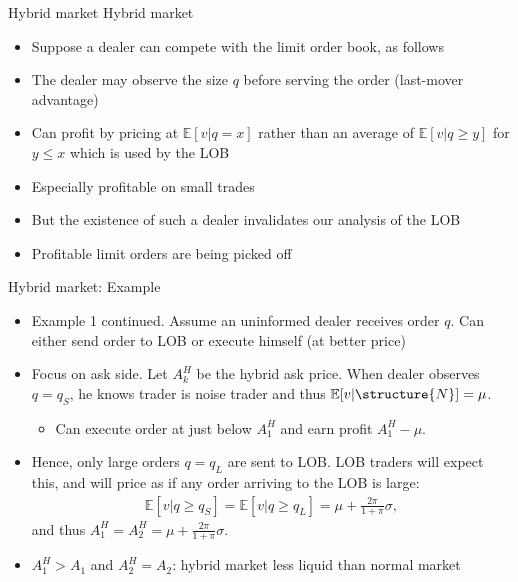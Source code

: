 \documentclass[english,10pt]{beamer}
\begin{document}
\begin{frame}{Hybrid market}
	Hybrid market
	\begin{itemize}
		\item Suppose a dealer can compete with the limit order book, as follows
		\item The dealer may observe the size $q$ before serving the order (last-mover advantage)
		\item Can profit by pricing at $\mathbb{E}[v|q=x]$ rather than an average of $\mathbb{E}[v|q \geq y]$ for $y \leq x$ which is used by the LOB
		\item Especially profitable on small trades
		\item But the existence of such a dealer invalidates our analysis of the LOB
		\item Profitable limit orders are being picked off
	\end{itemize}
\end{frame}


\begin{frame}{Hybrid market: Example}
	\begin{itemize}
		\item Example 1 continued. Assume an uninformed dealer receives order $q$. Can either send order to LOB or execute himself (at better price) 
		\item Focus on ask side. Let $A^H_k$ be the hybrid ask price. When dealer observes $q=q_S$, he knows trader is noise trader and thus $\mathbb{E}[v|\structure{N}]=\mu$. 
		\begin{itemize}
			\item Can execute order at just below $A^H_1$ and earn profit $A^H_1-\mu$.
		\end{itemize}
		\item Hence, only large orders $q=q_L$ are sent to LOB. LOB traders will expect this, and will price as if any order arriving to the LOB is large:
		\begin{align*}
		\mathbb{E}[v|q \ge q_S]=\mathbb{E}[v|q \ge q_L]=\mu+\frac{2\pi}{1+\pi} \sigma,
		\end{align*}
		and thus $A^H_1=A^H_2=\mu+\frac{2\pi}{1+\pi} \sigma$.
		\item $A^H_1>A_1$ and $A^H_2=A_2$: hybrid market less liquid than normal market
	\end{itemize}
\end{frame}
\end{document}
